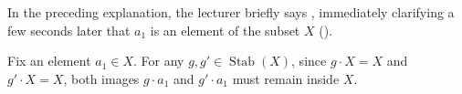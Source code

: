 \begin{proofWrapper}
\begin{aiNote}
In the preceding explanation, the lecturer briefly says , immediately clarifying a few seconds later that $a_1$ is an element of the subset $X$ ().
\end{aiNote}

\begin{content}
Fix an element $a_1 \in X$. For any $g, g' \in \operatorname{Stab}(X)$, since $g \cdot X = X$ and $g' \cdot X = X$, both images $g \cdot a_1$ and $g' \cdot a_1$ must remain inside $X$.


\end{content}
\end{proofWrapper}
